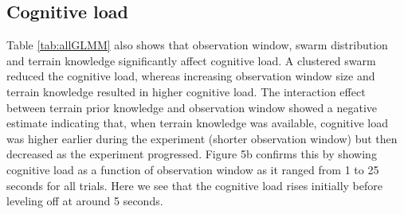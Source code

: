 \documentclass{article}
\begin{document}




\subsection{Cognitive load}




Table \ref{tab:allGLMM} also shows that observation window, swarm distribution and terrain knowledge significantly affect cognitive load. A clustered swarm reduced the cognitive load, whereas increasing observation window size and terrain knowledge resulted in higher cognitive load. The interaction effect between terrain prior knowledge and observation window showed a negative estimate indicating that, when terrain knowledge was available, cognitive load was higher earlier during the experiment (shorter observation window) but then decreased as the experiment progressed. Figure 5b confirms this by showing cognitive load as a function of observation window as it ranged from 1 to 25 seconds for all trials. Here we see that the cognitive load rises initially before leveling off at around 5 seconds.


\end{document}
